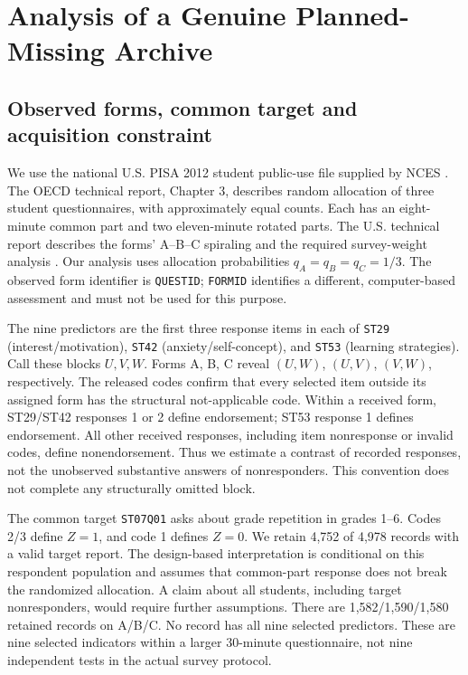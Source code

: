 \section{Analysis of a Genuine Planned-Missing Archive}\label{app:pisa}
\subsection{Observed forms, common target and acquisition constraint}
We use the national U.S. PISA 2012 student public-use file supplied by NCES
\citep{pisaus2014}. The OECD technical report, Chapter 3, describes random
allocation of three student questionnaires, with approximately equal
counts. Each has an eight-minute common part and two eleven-minute rotated
parts. The U.S. technical report describes the forms' A--B--C spiraling
and the required survey-weight analysis \citep{pisa2014,kastberg2014}.
Our analysis uses allocation probabilities $q_A=q_B=q_C=1/3$. The observed
form identifier is \texttt{QUESTID}; \texttt{FORMID} identifies a different,
computer-based assessment and must not be used for this purpose.

The nine predictors are the first three response items in each of
\texttt{ST29} (interest/motivation), \texttt{ST42} (anxiety/self-concept),
and \texttt{ST53} (learning strategies). Call these blocks $U,V,W$.
Forms A, B, C reveal $(U,W)$, $(U,V)$, $(V,W)$, respectively. The released
codes confirm that every selected item outside its assigned form has the
structural not-applicable code. Within a received form, ST29/ST42 responses
1 or 2 define endorsement; ST53 response 1 defines endorsement. All other
received responses, including item nonresponse or invalid codes, define
nonendorsement. Thus we estimate a contrast of recorded responses, not
the unobserved substantive answers of nonresponders. This convention does
not complete any structurally omitted block.

The common target \texttt{ST07Q01} asks about grade repetition in grades
1--6. Codes 2/3 define $Z=1$, and code 1 defines $Z=0$. We retain 4,752 of
4,978 records with a valid target report. The design-based interpretation
is conditional on this respondent population and assumes that common-part
response does not break the randomized allocation. A claim about all
students, including target nonresponders, would require further assumptions.
There are 1,582/1,590/1,580 retained records on A/B/C. No record has all
nine selected predictors. These are nine selected indicators within a
larger 30-minute questionnaire, not nine independent tests in the actual
survey protocol.

